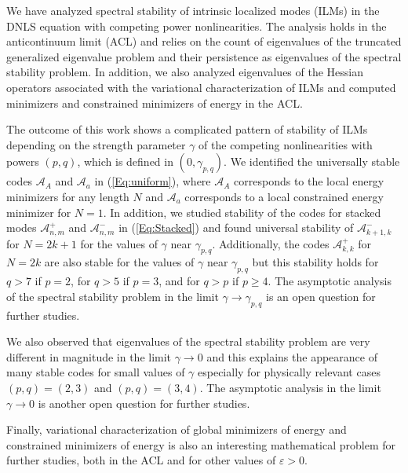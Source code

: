 \documentclass[12pt,reqno]{amsart}
\begin{document}
We have analyzed spectral stability of intrinsic localized modes (ILMs) in the DNLS equation with competing power nonlinearities. The analysis holds in the anticontinuum limit (ACL) and relies on the count of eigenvalues of the truncated generalized eigenvalue problem and their persistence as eigenvalues 
of the spectral stability problem. In addition, we also analyzed eigenvalues 
of the Hessian operators associated with the variational characterization 
of ILMs and computed minimizers and constrained minimizers of energy 
in the ACL.

The outcome of this work shows a complicated pattern of stability of ILMs 
depending on the strength parameter $\gamma$ of the competing nonlinearities 
with powers $(p,q)$, which is defined in $(0,\gamma_{p,q})$. We identified 
the universally stable codes $\mathcal{A}_A$ and $\mathcal{A}_a$ in (\ref{Eq:uniform}), where $\mathcal{A}_A$ corresponds to the local energy minimizers for any length $N$ and $\mathcal{A}_a$ corresponds to a local constrained energy minimizer for $N = 1$. In addition, we studied stability 
of the codes for stacked modes $\mathcal{A}_{n,m}^+$ and $\mathcal{A}_{n,m}^-$ in (\ref{Eq:Stacked}) and found universal stability of $\mathcal{A}_{k+1,k}^-$ for $N = 2k+1$ for the values of $\gamma$ near $\gamma_{p,q}$. Additionally, the codes $\mathcal{A}_{k,k}^+$ for $N = 2k$ are also stable for the values of $\gamma$ near $\gamma_{p,q}$ but this stability holds for $q > 7$ if $p = 2$, for $q > 5$ if $p = 3$, and for $q > p$ if $p \geq 4$. The asymptotic analysis 
of the spectral stability problem in the limit $\gamma \to \gamma_{p,q}$ is an open question for further studies.

We also observed that eigenvalues of the spectral stability problem 
are very different in magnitude in the limit $\gamma \to 0$ and this 
explains the appearance of many stable codes for small values of $\gamma$ 
especially for physically relevant cases $(p,q) = (2,3)$ and $(p,q) = (3,4)$. 
The asymptotic analysis in the limit $\gamma \to 0$ is another open question 
for further studies. 

Finally, variational characterization of global minimizers of energy 
and constrained minimizers of energy is also an interesting mathematical 
problem for further studies, both in the ACL and for other values of $\varepsilon > 0$.
\end{document}
